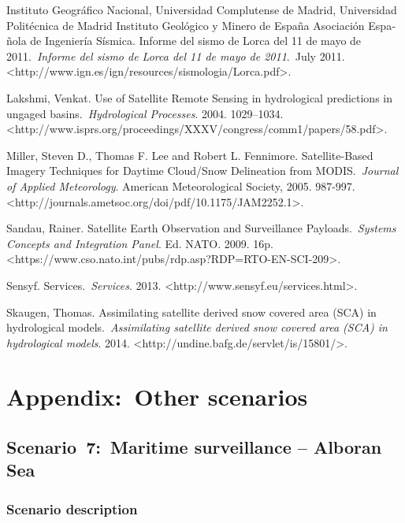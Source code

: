 \documentclass[a4paper]{article}
\begin{document}
\foreignlanguage{spanish}{Instituto Geogr\'afico Nacional, Universidad
Complutense de Madrid, Universidad Polit\'ecnica de Madrid Instituto
Geol\'ogico y Minero de Espa\~na Asociaci\'on Espa\~nola de
Ingenier\'ia S\'ismica. {\textquotedbl}Informe del sismo de Lorca del
11 de mayo de
2011.{\textquotedbl}\ }\foreignlanguage{spanish}{\textit{Informe del
sismo de Lorca del 11 de mayo de
2011}}\foreignlanguage{spanish}{.\ }July 2011.
{\textless}http://www.ign.es/ign/resources/sismologia/Lorca.pdf{\textgreater}.

Lakshmi, Venkat. {\textquotedbl}Use of Satellite Remote Sensing in
hydrological predictions in ungaged
basins.{\textquotedbl}\ \textit{Hydrological Processes}. 2004.
1029--1034.
{\textless}http://www.isprs.org/proceedings/XXXV/congress/comm1/papers/58.pdf{\textgreater}.

Miller, Steven D., Thomas F. Lee and Robert L. Fennimore.
{\textquotedbl}Satellite-Based Imagery Techniques for Daytime
Cloud/Snow Delineation from MODIS.{\textquotedbl}\ \textit{Journal of
Applied Meteorology}. American Meteorological Society, 2005. 987-997.
{\textless}http://journals.ametsoc.org/doi/pdf/10.1175/JAM2252.1{\textgreater}.

Sandau, Rainer. {\textquotedbl}Satellite Earth Observation and
Surveillance Payloads.{\textquotedbl}\ \textit{Systems Concepts and
Integration Panel}. Ed. NATO. 2009. 16p.
{\textless}https://www.cso.nato.int/pubs/rdp.asp?RDP=RTO-EN-SCI-209{\textgreater}.

Sensyf. {\textquotedbl}Services.{\textquotedbl}\ \textit{Services}.
2013. {\textless}http://www.sensyf.eu/services.html{\textgreater}.

Skaugen, Thomas. {\textquotedbl}Assimilating satellite derived snow
covered area (SCA) in hydrological
models.{\textquotedbl}\ \textit{Assimilating satellite derived snow
covered area (SCA) in hydrological models}. 2014.
{\textless}http://undine.bafg.de/servlet/is/15801/{\textgreater}.


\bigskip


\bigskip

\clearpage
\bigskip

\section[Appendix:\ Other scenarios]{Appendix:\ Other scenarios}
\label{bkm:Ref378852215}\hypertarget{Toc381777259}{}\subsection[Scenario\ 7:\ Maritime
surveillance {}-- Alboran Sea]{
Scenario\ 7:\ Maritime surveillance -- Alboran Sea}
\hypertarget{Toc381777260}{}\subsubsection[Scenario
description]{ Scenario description}
\hypertarget{Toc381777261}{}
\bigskip
\end{document}
